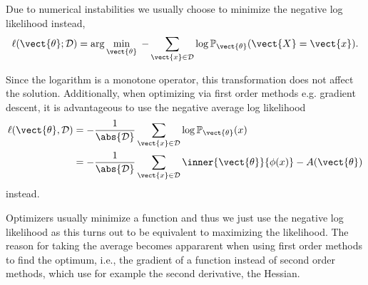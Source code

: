    Due to numerical instabilities we usually choose to minimize the negative log likelihood instead,
    \begin{equation}
        \label{eq:likelihood:log}
        \ell(\vect{\theta} ; \mathcal{D}) = \arg\min_{\vect{\theta}} \; - \sum_{\vect{x} \in \mathcal{D}}  \log \mathbb{P}_{\vect{\theta}}(\vect{X} = \vect{x}).
    \end{equation}

    Since the logarithm is a monotone operator, this transformation does not affect the solution.
    Additionally, when optimizing via first order methods e.g. gradient descent, it is advantageous to use the negative average log likelihood
    \begin{equation}
        \label{eq:likelihood:expfam}
        \begin{split}
        \ell(\vect{\theta}, \mathcal{D}) &= - \frac{1}{\abs{\mathcal{D}}} \sum_{\vect{x} \in \mathcal{D}} \log \mathbb{P}_{\vect{\theta}}(x)\\
        &= - \frac{1}{\abs{\mathcal{D}}} \sum_{\vect{x} \in \mathcal{D}} \inner{\vect{\theta}}{\phi(x)} - A(\vect{\theta})
    \end{split}
    \end{equation}
    instead.

    Optimizers usually minimize a function and thus we just use the negative log likelihood as this turns out to be equivalent to maximizing the likelihood.
    The reason for taking the average becomes appararent when using first order methods to find the optimum, i.e., the gradient of a function instead of second order methods, which use for example the second derivative, the Hessian.

